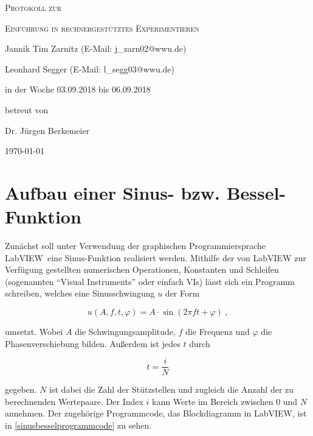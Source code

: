 \documentclass[
a4paper,
12pt,
pagesize,
ngerman
]{scrartcl}
\begin{document}
	
	\begin{titlepage}
		\centering
		{\scshape\LARGE Protokoll zur \par} 
		\vspace{1cm}
		{\scshape\huge Einführung in rechnergestütztes Experimentieren \par}
		\vspace{3cm}
		
		{\large Jannik Tim Zarnitz (E-Mail: j\_zarn02@wwu.de) \par}
		{\large Leonhard Segger (E-Mail: l\_segg03@wwu.de) \par}
		\vfill
		
		in der Woche 03.09.2018 bis 06.09.2018\par
		betreut von\par
		{\large Dr. Jürgen Berkemeier}
		
		\vfill
		
		{\large \today\par}
	\end{titlepage}
	\tableofcontents
	\newpage


	\section{Aufbau einer Sinus- bzw. Bessel-Funktion} \label{sinusfkt}
	
	Zunächst soll unter Verwendung der graphischen Programmiersprache \glqq LabVIEW\grqq\ eine Sinus-Funktion realisiert werden.
	Mithilfe der von LabVIEW zur Verfügung gestellten numerischen Operationen, Konstanten und Schleifen (sogenannten \enquote{Visual Instruments} oder einfach VIs) lässt sich ein Programm schreiben, welches eine Sinusschwingung $u$ der Form
	
	\begin{equation} \label{u}
	u(A,f,t,\varphi) = A \cdot \sin(2\pi f t + \varphi) \ ,
	\end{equation}
	
	\noindent umsetzt. Wobei $A$ die Schwingungsamplitude, $f$ die Frequenz und $\varphi$ die Phasenverschiebung bilden. Außerdem ist jedes $t$ durch 
	
	\begin{equation} \label{t}
	t = \frac{i}{N}
	\end{equation}
	
	\noindent gegeben. $N$ ist dabei die Zahl der Stützstellen und zugleich die Anzahl der zu berechnenden Wertepaare. Der Index $i$ kann Werte im Bereich zwischen $0$ und $N$ annehmen. Der zugehörige Programmcode, das Blockdiagramm in LabVIEW, ist in \cref{sinusbesselprogrammcode} zu sehen. 
	
\end{document}
